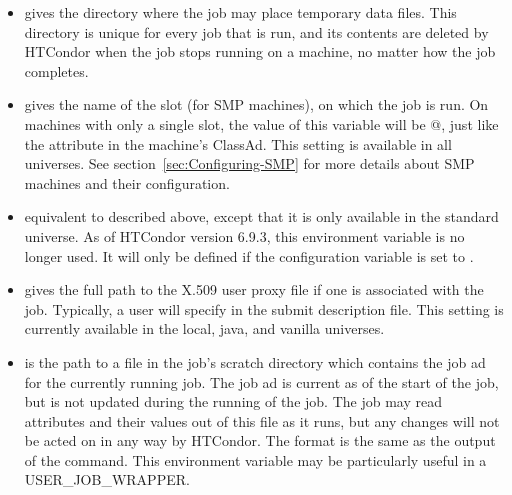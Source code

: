 \begin{itemize}
\item {}
 gives the directory
where the job may place temporary data files. 
This directory is unique for every job that is run,
and its contents are deleted by HTCondor
when the job stops running on a machine, no matter how the job completes.

\item {}
gives the name of the slot (for SMP machines), on which the job is run.
On machines with only a single slot, the value of this variable will be
@, just like the  attribute in the machine's
ClassAd.
This setting is available in all universes.
See section~\ref{sec:Configuring-SMP} for more details about SMP
machines and their configuration.

\item {}
equivalent to  described above, except that it is
only available in the standard universe.
\Note As of HTCondor version 6.9.3, this environment variable is no longer
used.
It will only be defined if the  configuration
variable is set to .

\item {}
gives the full path to the X.509 user proxy file if one is
associated with the job.  Typically, a user will specify
 in the submit description file.
This setting is currently available in the
local, java, and vanilla universes.

\item {}
is the path to a file in the job's scratch directory which contains
the job ad for the currently running job.  The job ad is current
as of the start of the job, but is not updated during the running
of the job.  The job may read attributes and their values out of
this file as it runs, but any changes will not be acted on in any
way by HTCondor.  The format is the same as the output of the
   command.  This environment variable may be particularly
useful in a USER\_JOB\_WRAPPER.


\end{itemize}
